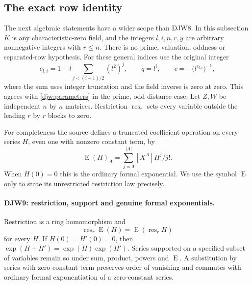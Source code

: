 \subsection{The exact row identity}

The next algebraic statements have a wider scope than DJW8.
In this subsection $K$ is any characteristic-zero field, and the
integers $l,i,n,r,y$ are arbitrary nonnegative integers with $r\le n$.
There is no prime, valuation, oddness or separated-row hypothesis.
For these general indices use the original integer
\[
 e_{l,i}=1+l\sum_{j<(i-1)/2}(l^2)^j,
 \qquad q=l^i,\qquad c=-\bigl(l^{e_{l,i}}\bigr)^{-1},
\]
where the sum uses integer truncation and the field inverse is zero
at zero.  This agrees with \eqref{djw:parameters} in the prime,
odd-distance case.  Let $Z,W$ be independent $n$ by $n$ matrices.
Restriction $\operatorname{res}_r$ sets every variable outside the
leading $r$ by $r$ blocks to zero.

For completeness the source defines a truncated coefficient operation
on every series $H$, even one with nonzero constant term, by
\[
 \operatorname{E}(H)_A
       =\sum_{j=0}^{|A|}[X^A]H^j/j!.
\]
When $H(0)=0$ this is the ordinary formal exponential.  We use
the symbol $\operatorname{E}$ only to state its unrestricted
restriction law precisely.

\paragraph{DJW9: restriction, support and genuine formal exponentials.}
\label{claim:DJW9}
Restriction is a ring homomorphism and
\[
 \operatorname{res}_r\operatorname{E}(H)
       =\operatorname{E}(\operatorname{res}_rH)
\]
for every $H$.  If $H(0)=H'(0)=0$, then
$\exp(H+H')=\exp(H)\exp(H')$.
Series supported on a specified subset of variables remain so under
sum, product, powers and $\operatorname{E}$.  A substitution by
series with zero constant term preserves order of vanishing and
commutes with ordinary formal exponentiation of a zero-constant
series.

